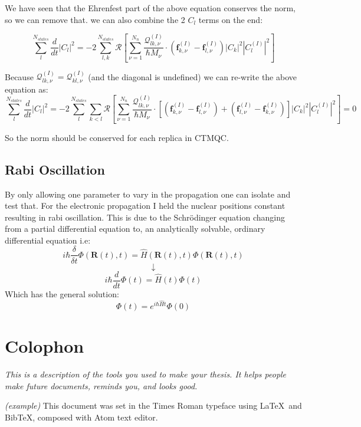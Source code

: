 We have seen that the Ehrenfest part of the above equation conserves the norm, so we can remove that. we can also combine the 2 $C_l$ terms on the end:

\[ \sum_{l}^{N_{states}} \frac{d}{dt} \vert C_{l} \vert^2 = -2 \sum_{l,k}^{N_{states}} \mathcal{R}\left[ \sum_{\nu=1}^{N_n}\frac{\mathcal{Q}_{lk,\nu}^{(I)}}{\hbar M_{\nu}}\cdot \left(\textbf{f}_{k,\nu}^{(I)} - \textbf{f}_{l,\nu}^{(I)}\right)|C_k|^2 |C_l^{(I)}|^2 \right] \]

Because $\mathcal{Q}_{lk,\nu}^{(I)} = \mathcal{Q}_{kl,\nu}^{(I)}$ (and the diagonal is undefined) we can re-write the above equation as:
\[ \sum_{l}^{N_{states}} \frac{d}{dt} \vert C_{l} \vert^2 = -2 \sum_{l}^{N_{states}} \sum_{k<l} \mathcal{R}\left[ \sum_{\nu=1}^{N_n}\frac{\mathcal{Q}_{lk,\nu}^{(I)}}{\hbar M_{\nu}}\cdot \left[ \left(\textbf{f}_{k,\nu}^{(I)} - \textbf{f}_{l,\nu}^{(I)}\right) + \left(\textbf{f}_{l,\nu}^{(I)} - \textbf{f}_{k,\nu}^{(I)}\right)\right]|C_k|^2 |C_l^{(I)}|^2 \right] = 0 \]

So the norm should be conserved for each replica in CTMQC.

\section{Rabi Oscillation \label{ap:Rabi}}
By only allowing one parameter to vary in the propagation one can isolate and test that. For the electronic propagation I held the nuclear positions constant resulting in rabi oscillation. This is due  to the Schr\"odinger equation changing from a partial differential equation to, an analytically solvable, ordinary differential equation  i.e:
\[i \hbar \frac{\delta}{\delta t} \Phi(\textbf{R}(t), t) = \hat{H}(\textbf{R}(t), t) \Phi(\textbf{R}(t), t)\]
\[\downarrow\]
\[i \hbar \frac{d}{d t} \Phi(t) = \hat{H}(t) \Phi( t)\]
Which has the general solution:
\[\Phi(t) = e^{i \hbar \hat{H}t} \Phi(0)\]




\chapter{Colophon}
\label{appendixlabel3}
\textit{This is a description of the tools you used to make your thesis. It helps people make future documents, reminds you, and looks good.}

\textit{(example)} This document was set in the Times Roman typeface using \LaTeX\ and Bib\TeX , composed with Atom text editor.

